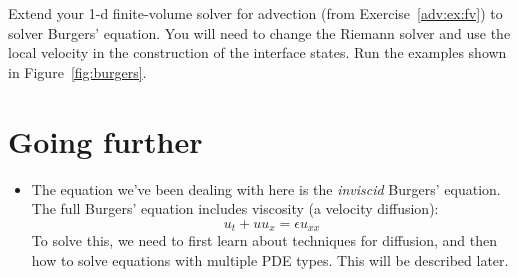 \begin{exercise}
{Extend your 1-d finite-volume solver for advection (from Exercise~\ref{adv:ex:fv}) to solver Burgers' equation.  You will need to change the Riemann solver
and use the local velocity in the construction of the interface states.  Run
the examples shown in Figure~\ref{fig:burgers}}.
\end{exercise}

\section{Going further}

\begin{itemize}
\item The equation we've been dealing with here is the {\em inviscid} Burgers' equation. 
The full Burgers' equation includes viscosity (a velocity diffusion):
\begin{equation}
u_t + u u_x = \epsilon u_{xx}
\end{equation}
To solve this, we need to first learn about techniques for diffusion, and then how to
solve equations with multiple PDE types.  This will be described later.

\end{itemize}
